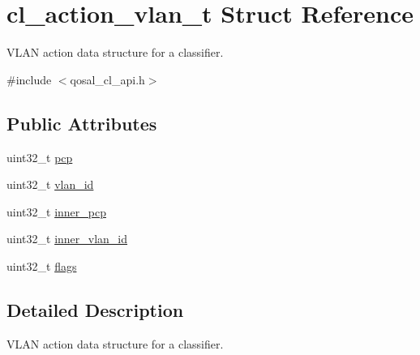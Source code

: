 \hypertarget{structcl__action__vlan__t}{\section{cl\-\_\-action\-\_\-vlan\-\_\-t Struct Reference}
\label{structcl__action__vlan__t}
}


V\-L\-A\-N action data structure for a classifier.  




{\ttfamily \#include $<$qosal\-\_\-cl\-\_\-api.\-h$>$}

\subsection*{Public Attributes}
\begin{DoxyCompactItemize}
\item 
uint32\-\_\-t \hyperlink{structcl__action__vlan__t_a544d3fe82906bb8ca55ed3a5122b9fa4}{pcp}
\item 
uint32\-\_\-t \hyperlink{structcl__action__vlan__t_a04b2911e9e7e2f2b16d8488f924f441a}{vlan\-\_\-id}
\item 
uint32\-\_\-t \hyperlink{structcl__action__vlan__t_a9f3ffb7da0987a4e8080bb5cc3bf8122}{inner\-\_\-pcp}
\item 
uint32\-\_\-t \hyperlink{structcl__action__vlan__t_a2dda44d51a174c88c1a5200c7de1f3d1}{inner\-\_\-vlan\-\_\-id}
\item 
uint32\-\_\-t \hyperlink{structcl__action__vlan__t_ad947b4c233c844235c425401d48f90ab}{flags}
\end{DoxyCompactItemize}


\subsection{Detailed Description}
V\-L\-A\-N action data structure for a classifier. 

